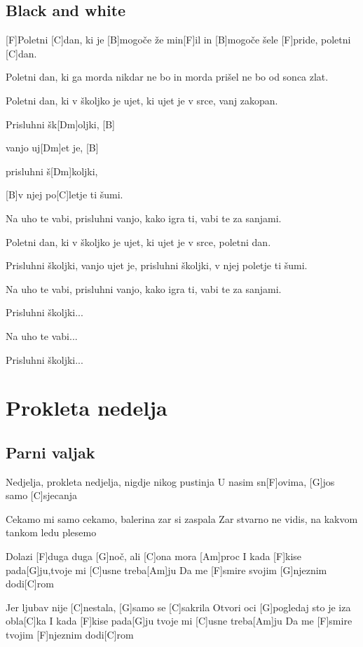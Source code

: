 \documentclass[a4paper,12pt]{article}
\begin{document}
\begin{multicols}{2}
\subsection*{Black and white}
\begin{guitar}

[F]Poletni [C]dan, ki je [B]mogoče že min[F]il 
in [B]mogoče šele [F]pride, poletni [C]dan. 


Poletni dan, ki ga morda nikdar ne bo 
in morda prišel ne bo od sonca zlat. 


Poletni dan, ki v školjko je ujet, 
ki ujet je v srce, vanj zakopan. 


Prisluhni šk[Dm]oljki, [B]

vanjo uj[Dm]et je, [B]
           
prisluhni š[Dm]koljki, 
          
[B]v njej po[C]letje ti šumi. 


Na uho te vabi, 
prisluhni vanjo, 
kako igra ti, 
vabi te za sanjami. 


Poletni dan, ki v školjko je ujet, 
ki ujet je v srce, poletni dan. 


Prisluhni školjki, 
vanjo ujet je, 
prisluhni školjki, 
v njej poletje ti šumi. 


Na uho te vabi, 
prisluhni vanjo, 
kako igra ti, 
vabi te za sanjami. 


Prisluhni školjki... 


Na uho te vabi... 


Prisluhni školjki... 

\end{guitar}
\section{Prokleta nedelja}
\subsection*{Parni valjak}
\begin{guitar}
[C]Nedjelja, prokleta nedjelja,
nigdje nikog pustinja
U nasim sn[F]ovima, 
[G]jos samo [C]sjecanja


Cekamo mi samo cekamo,
balerina zar si zaspala
Zar stvarno ne vidis,
na kakvom tankom ledu plesemo
    

Dolazi [F]duga duga [G]noč, ali [C]ona mora [Am]proc
I kada [F]kise pada[G]ju,tvoje mi [C]usne treba[Am]ju
Da me [F]smire svojim [G]njeznim dodi[C]rom
    

Jer ljubav nije [C]nestala, [G]samo se [C]sakrila
Otvori oci [G]pogledaj sto je iza obla[C]ka
I kada [F]kise pada[G]ju tvoje mi [C]usne treba[Am]ju
Da me [F]smire tvojim [F]njeznim dodi[C]rom
    

\end{guitar}
\end{multicols}
\end{document}
